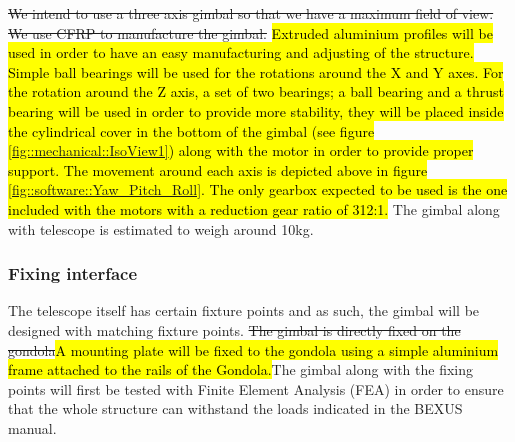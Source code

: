 \begin{figure}[h]
\end{figure}

\st{We intend to use a three axis gimbal so that we have a maximum field of view. We use CFRP to manufacture the gimbal.} \hl{Extruded aluminium profiles will be used in order to have an easy manufacturing and adjusting of the structure. Simple ball bearings will be used for the rotations around the X and Y axes. For the rotation around the Z axis, a set of two bearings; a ball bearing and a thrust bearing will be used in order to provide more stability, they will be placed inside the cylindrical cover in the bottom of the gimbal (see figure \mbox{\ref{fig::mechanical::IsoView1})} along with the motor in order to provide proper support. The movement around each axis is depicted above in figure \mbox{\ref{fig::software::Yaw_Pitch_Roll}}. The only gearbox expected to be used is the one included with the motors with a reduction gear ratio of 312:1. } The gimbal along with telescope is estimated to weigh around 10kg.



\subsubsection{Fixing interface}
\label {sec:4.4.5}
The telescope itself has certain fixture points and as such, the gimbal will be designed with matching fixture points.\st{ The gimbal is directly fixed on the gondola}\hl{A mounting plate will be fixed to the gondola using a simple aluminium frame attached to the rails of the Gondola.}The gimbal along with the fixing points will first be tested with Finite Element Analysis (FEA) in order to ensure that the whole structure can withstand the loads indicated in the BEXUS manual.
